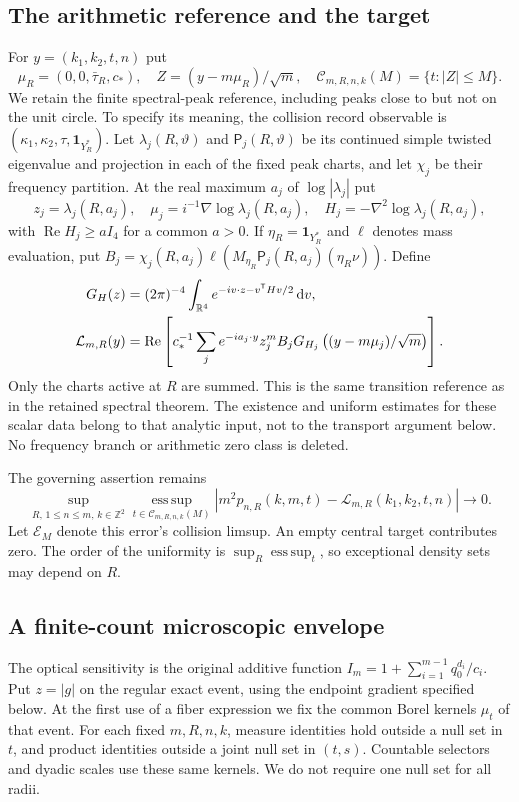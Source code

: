 \documentclass[11pt,reqno]{amsart}
\numberwithin{equation}{section}
\theoremstyle{definition}\newtheorem{definition}[theorem]{Definition}
\theoremstyle{remark}\newtheorem{remark}[theorem]{Remark}
\newcommand{\R}{\mathbb R}\newcommand{\Z}{\mathbb Z}\newcommand{\T}{\mathbb T}
\newcommand{\dd}{\,\mathrm d}\newcommand{\one}{\mathbf1}
\theoremstyle{definition}\newtheorem{inputstatement}[theorem]{Input statement}
\newcommand{\esssup}{\operatorname*{ess\,sup}}
\begin{document}
\subsection{The arithmetic reference and the target}
For $y=(k_1,k_2,t,n)$ put
\[
 \mu_R=(0,0,\bar\tau_R,c_*),\quad
 Z=(y-m\mu_R)/\sqrt m,\quad
 \mathcal C_{m,R,n,k}(M)=\{t:|Z|\le M\}.
\]
We retain the finite spectral-peak reference, including peaks close to
but not on the unit circle. To specify its meaning, the collision
record observable is $(\kappa_1,\kappa_2,\tau,\one_{Y_R^*})$.
Let $\lambda_j(R,\vartheta)$ and $\mathsf P_j(R,\vartheta)$ be its
continued simple twisted eigenvalue and projection in each of the
fixed peak charts, and let $\chi_j$ be their frequency partition.
At the real maximum $a_j$ of $\log|\lambda_j|$ put
\[
 z_j=\lambda_j(R,a_j),\quad
 \mu_j=i^{-1}\nabla\log\lambda_j(R,a_j),\quad
 H_j=-\nabla^2\log\lambda_j(R,a_j),
\]
with $\operatorname{Re}H_j\ge aI_4$ for a common $a>0$. If
$\eta_R=\one_{Y_R^*}$ and $\ell$ denotes mass evaluation, put
$B_j=\chi_j(R,a_j)\ell(M_{\eta_R}\mathsf P_j(R,a_j)(\eta_R\nu))$.
Define
\begin{align}
 G_H(z)&=(2\pi)^{-4}\int_{\R^4}e^{-iv\cdot z-v^{\mathsf T}Hv/2}\dd v,
 \notag\\
 \mathcal L_{m,R}(y)&=\operatorname{Re}\left[
 c_*^{-1}\sum_j e^{-ia_j\cdot y}z_j^m B_j
      G_{H_j}\left((y-m\mu_j)/\sqrt m\right)\right].
 \label{eq:v76-reference}
\end{align}
Only the charts active at $R$ are summed. This is the same transition
reference as in the retained spectral theorem. The existence and
uniform estimates for these scalar data belong to that analytic
input, not to the transport argument below. No frequency branch or
arithmetic zero class is deleted.

The governing assertion remains
\begin{equation}\label{eq:v76-target}
 \sup_{R,\,1\le n\le m,\,k\in\Z^2}
 \esssup_{t\in\mathcal C_{m,R,n,k}(M)}
 |m^2p_{n,R}(k,m,t)-\mathcal L_{m,R}(k_1,k_2,t,n)|\longrightarrow0.
\end{equation}
Let $\mathcal E_M$ denote this error's collision limsup. An empty
central target contributes zero. The order of the uniformity is
$\sup_R\esssup_t$, so exceptional density sets may depend on $R$.

\subsection{A finite-count microscopic envelope}
The optical sensitivity is the original additive function
$I_m=1+\sum_{i=1}^{m-1}q_0^{d_i}/c_i$. Put $z=|g|$ on the
regular exact event, using the endpoint gradient specified below.
At the first use of a fiber expression we fix the common Borel kernels
$\mu_t$ of that event. For each fixed $m,R,n,k$, measure identities
hold outside a null set in $t$, and product identities outside a joint
null set in $(t,s)$. Countable selectors and dyadic scales use these
same kernels. We do not require one null set for all radii.
\end{document}
